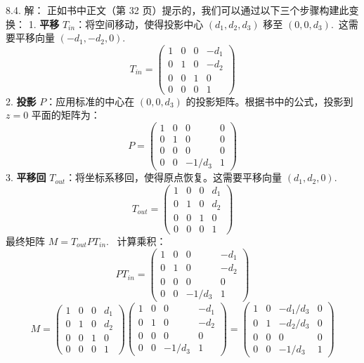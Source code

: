 \begin{exer}
8.4. 解：
正如书中正文（第 32 页）提示的，我们可以通过以下三个步骤构建此变换：
1. \textbf{平移} $T_{in}$：将空间移动，使得投影中心 $(d_1, d_2, d_3)$ 移至 $(0, 0, d_3)$.~这需要平移向量 $(-d_1, -d_2, 0)$.~
   $$ T_{in} = \begin{pmatrix} 1 & 0 & 0 & -d_1 \\ 0 & 1 & 0 & -d_2 \\ 0 & 0 & 1 & 0 \\ 0 & 0 & 0 & 1 \end{pmatrix} $$
2. \textbf{投影} $P$：应用标准的中心在 $(0, 0, d_3)$ 的投影矩阵。根据书中的公式，投影到 $z=0$ 平面的矩阵为：
   $$ P = \begin{pmatrix} 1 & 0 & 0 & 0 \\ 0 & 1 & 0 & 0 \\ 0 & 0 & 0 & 0 \\ 0 & 0 & -1/d_3 & 1 \end{pmatrix} $$
3. \textbf{平移回} $T_{out}$：将坐标系移回，使得原点恢复。这需要平移向量 $(d_1, d_2, 0)$.~
   $$ T_{out} = \begin{pmatrix} 1 & 0 & 0 & d_1 \\ 0 & 1 & 0 & d_2 \\ 0 & 0 & 1 & 0 \\ 0 & 0 & 0 & 1 \end{pmatrix} $$
最终矩阵 $M = T_{out} P T_{in}$.~
计算乘积：
$$ P T_{in} = \begin{pmatrix} 1 & 0 & 0 & -d_1 \\ 0 & 1 & 0 & -d_2 \\ 0 & 0 & 0 & 0 \\ 0 & 0 & -1/d_3 & 1 \end{pmatrix} $$
$$
M = \begin{pmatrix} 1 & 0 & 0 & d_1 \\ 0 & 1 & 0 & d_2 \\ 0 & 0 & 1 & 0 \\ 0 & 0 & 0 & 1 \end{pmatrix} \begin{pmatrix} 1 & 0 & 0 & -d_1 \\ 0 & 1 & 0 & -d_2 \\ 0 & 0 & 0 & 0 \\ 0 & 0 & -1/d_3 & 1 \end{pmatrix} = \begin{pmatrix} 1 & 0 & -d_1/d_3 & 0 \\ 0 & 1 & -d_2/d_3 & 0 \\ 0 & 0 & 0 & 0 \\ 0 & 0 & -1/d_3 & 1 \end{pmatrix}
$$


\end{exer}
